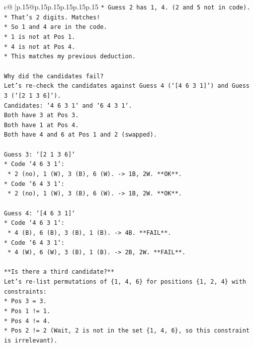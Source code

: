 \documentclass{article}
\begin{document}
{\begin{supertabular}{c@{$\;$}|p{.15\linewidth}@{}p{.15\linewidth}p{.15\linewidth}p{.15\linewidth}p{.15\linewidth}p{.15\linewidth}}
{{{\texttt{*   Guess 2 has 1, 4. (2 and 5 not in code).} \\
\texttt{*   That's 2 digits. Matches!} \\
\texttt{*   So 1 and 4 are in the code.} \\
\texttt{*   1 is not at Pos 1.} \\
\texttt{*   4 is not at Pos 4.} \\
\texttt{*   This matches my previous deduction.} \\
\\ 
\texttt{Why did the candidates fail?} \\
\texttt{Let's re{-}check the candidates against Guess 4 (`{[}4 6 3 1{]}`) and Guess 3 (`{[}2 1 3 6{]}`).} \\
\texttt{Candidates: `4 6 3 1` and `6 4 3 1`.} \\
\texttt{Both have 3 at Pos 3.} \\
\texttt{Both have 1 at Pos 4.} \\
\texttt{Both have 4 and 6 at Pos 1 and 2 (swapped).} \\
\\ 
\texttt{Guess 3: `{[}2 1 3 6{]}`} \\
\texttt{*   Code `4 6 3 1`:} \\
\texttt{    *   2 (no), 1 (W), 3 (B), 6 (W). {-}> 1B, 2W. **OK**.} \\
\texttt{*   Code `6 4 3 1`:} \\
\texttt{    *   2 (no), 1 (W), 3 (B), 6 (W). {-}> 1B, 2W. **OK**.} \\
\\ 
\texttt{Guess 4: `{[}4 6 3 1{]}`} \\
\texttt{*   Code `4 6 3 1`:} \\
\texttt{    *   4 (B), 6 (B), 3 (B), 1 (B). {-}> 4B. **FAIL**.} \\
\texttt{*   Code `6 4 3 1`:} \\
\texttt{    *   4 (W), 6 (W), 3 (B), 1 (B). {-}> 2B, 2W. **FAIL**.} \\
\\ 
\texttt{**Is there a third candidate?**} \\
\texttt{Let's re{-}list permutations of \{1, 4, 6\} for positions \{1, 2, 4\} with constraints:} \\
\texttt{*   Pos 3 = 3.} \\
\texttt{*   Pos 1 != 1.} \\
\texttt{*   Pos 4 != 4.} \\
\texttt{*   Pos 2 != 2 (Wait, 2 is not in the set \{1, 4, 6\}, so this constraint is irrelevant).} \\
}}}
\end{supertabular}}
\end{document}
